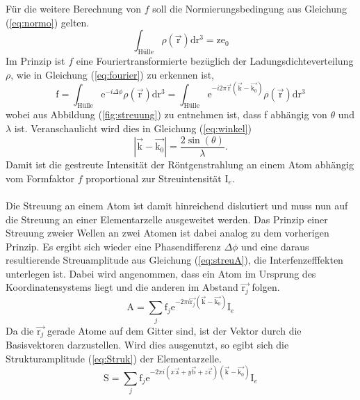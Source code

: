 Für die weitere Berechnung von $f$ soll die Normierungsbedingung aus Gleichung (\ref{eq:normo}) gelten.
\begin{equation}
 \int_{\text{Hülle}} \rho (\vec{\text{r}}) \text{d}\text{r}^3 = \text{z}\text{e}_0
\label{eq:normo}
\end{equation}
Im Prinzip ist $f$ eine Fouriertransformierte bezüglich der Ladungsdichteverteilung $\rho$, wie in Gleichung (\ref{eq:fourier}) zu erkennen ist,
\begin{equation}
\text{f} = \int_{\text{Hülle}} \text{e}^{-i\Delta\phi}\rho(\vec{\text{r}}) \text{d}\text{r}^3 = \int_{\text{Hülle}} \text{e}^{-i2\pi \vec{\text{r}}(\vec{\text{k}}-\vec{\text{k}_0})}\rho(\vec{\text{r}}) \text{d}\text{r}^3
\label{eq:fourier}
\end{equation}
wobei aus Abbildung (\ref{fig:streuung}) zu entnehmen ist, dass f abhängig von $\theta$ und $\lambda$ ist.
Veranschaulicht wird dies in Gleichung (\ref{eq:winkel})
\begin{equation}
|\vec{\text{k}}-\vec{\text{k}_0}| = \frac{2 \sin(\theta)}{\lambda}.
\label{eq:winkel}
\end{equation}
Damit ist die gestreute Intensität der Röntgenstrahlung an einem Atom abhängig vom Formfaktor $f$ proportional zur Streuintensität I$_e$.\\\\
Die Streuung an einem Atom ist damit hinreichend diskutiert und muss nun auf die Streuung an einer Elementarzelle ausgeweitet werden.
Das Prinzip  einer Streuung zweier Wellen an zwei Atomen ist dabei analog zu dem vorherigen Prinzip.
Es ergibt sich wieder eine Phasendifferenz $\Delta \phi$ und eine daraus resultierende Streuamplitude aus Gleichung (\ref{eq:streuA}), die Interfenzefffekten unterlegen ist.
Dabei wird angenommen, dass ein Atom im Ursprung des Koordinatensystems liegt und die anderen im Abstand $\vec{\text{r}_j}$ folgen.
\begin{equation}
\text{A} = \sum_j \text{f}_j \text{e}^{-2\pi i \vec{\text{r}_j} (\vec{\text{k}}-\vec{\text{k}_0}) } \text{I}_e
\label{eq:streuA}
\end{equation}
Da die $\vec{\text{r}_j}$ gerade Atome auf dem Gitter sind, ist der Vektor durch die Basisvektoren darzustellen.
Wird dies ausgenutzt, so egibt sich die Strukturamplitude (\ref{eq:Struk}) der Elementarzelle.
\begin{equation}
\text{S} = \sum_j \text{f}_j \text{e}^{-2\pi i (x\vec{\text{a}}+y \vec{\text{b}}+ z \vec{\text{c}}) (\vec{\text{k}}-\vec{\text{k}_0}) } \text{I}_e
\label{eq:Struk}
\end{equation}
